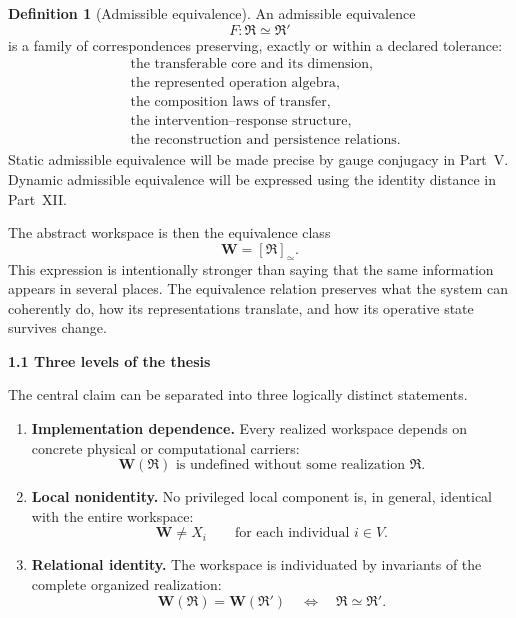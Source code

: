 \documentclass[11pt,letterpaper]{article}
\newcommand{\Workspace}{\mathbf W}
\newcommand{\subtopic}[1]{%
 \vspace{0.45em}
 {\bfseries\color{AccentColor} #1\par}
}
\theoremstyle{plain}
\theoremstyle{definition}
\newtheorem{definition}[theorem]{Definition}
\begin{document}
\begin{definition}[Admissible equivalence]\label{def:admissible-equivalence}
An admissible equivalence
\[
F:\mathfrak R\simeq\mathfrak R'
\]
is a family of correspondences preserving, exactly or within a declared
tolerance:
\[
\begin{aligned}
&\text{the transferable core and its dimension},\\
&\text{the represented operation algebra},\\
&\text{the composition laws of transfer},\\
&\text{the intervention--response structure},\\
&\text{the reconstruction and persistence relations}.
\end{aligned}
\]
Static admissible equivalence will be made precise by gauge conjugacy in
Part~V. Dynamic admissible equivalence will be expressed using the identity
distance in Part~XII.
\end{definition}

The abstract workspace is then the equivalence class
\[
\boxed{
\Workspace=[\mathfrak R]_{\simeq}.
}
\]
This expression is intentionally stronger than saying that the same
information appears in several places. The equivalence relation preserves
what the system can coherently do, how its representations translate, and how
its operative state survives change.

\subtopic{1.1 Three levels of the thesis}

The central claim can be separated into three logically distinct statements.

\begin{enumerate}
\item \textbf{Implementation dependence.}
Every realized workspace depends on concrete physical or computational
carriers:
\[
\Workspace(\mathfrak R)
\text{ is undefined without some realization }\mathfrak R.
\]

\item \textbf{Local nonidentity.}
No privileged local component is, in general, identical with the entire
workspace:
\[
\Workspace\neq X_i
\qquad\text{for each individual }i\in V.
\]

\item \textbf{Relational identity.}
The workspace is individuated by invariants of the complete organized
realization:
\[
\Workspace(\mathfrak R)=\Workspace(\mathfrak R')
\quad\Longleftrightarrow\quad
\mathfrak R\simeq\mathfrak R'.
\]
\end{enumerate}
\end{document}
